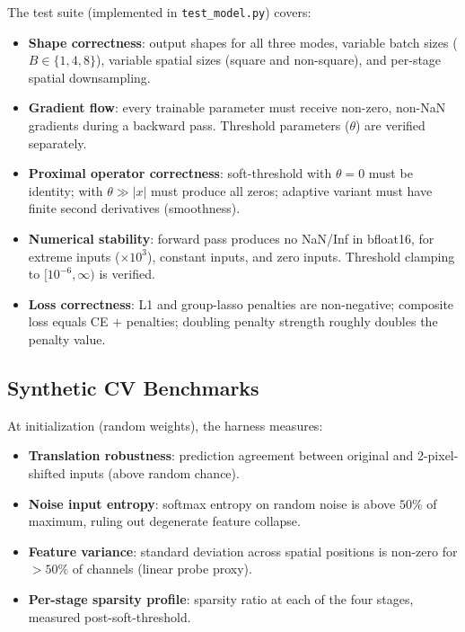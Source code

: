 \documentclass{article}
\begin{document}
The test suite (implemented in \texttt{test\_model.py}) covers:

\begin{itemize}
    \item \textbf{Shape correctness}: output shapes for all three modes,
          variable batch sizes ($B \in \{1, 4, 8\}$), variable spatial sizes
          (square and non-square), and per-stage spatial downsampling.
    \item \textbf{Gradient flow}: every trainable parameter must receive
          non-zero, non-NaN gradients during a backward pass. Threshold
          parameters ($\theta$) are verified separately.
    \item \textbf{Proximal operator correctness}: soft-threshold with
          $\theta=0$ must be identity; with $\theta \gg |x|$ must produce
          all zeros; adaptive variant must have finite second derivatives
          (smoothness).
    \item \textbf{Numerical stability}: forward pass produces no NaN/Inf in
          bfloat16, for extreme inputs ($\times 10^3$), constant inputs, and
          zero inputs. Threshold clamping to $[10^{-6}, \infty)$ is verified.
    \item \textbf{Loss correctness}: L1 and group-lasso penalties are
          non-negative; composite loss equals CE $+$ penalties; doubling
          penalty strength roughly doubles the penalty value.
\end{itemize}

\subsection{Synthetic CV Benchmarks}

At initialization (random weights), the harness measures:
\begin{itemize}
    \item \textbf{Translation robustness}: prediction agreement between
          original and 2-pixel-shifted inputs (above random chance).
    \item \textbf{Noise input entropy}: softmax entropy on random noise is
          above $50\%$ of maximum, ruling out degenerate feature collapse.
    \item \textbf{Feature variance}: standard deviation across spatial
          positions is non-zero for $>50\%$ of channels (linear probe proxy).
    \item \textbf{Per-stage sparsity profile}: sparsity ratio at each of the
          four stages, measured post-soft-threshold.
\end{itemize}
\end{document}
